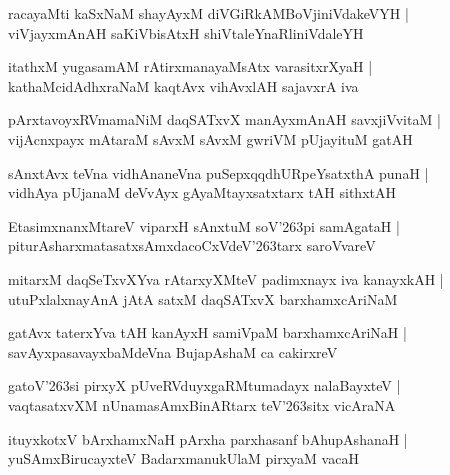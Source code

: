 \documentclass[twoside,12pt,openright]{book}
\def\S{\char'263}
\newcounter{shloka}[chapter]
\begin{document}
\begin{shloka}
racayaMti kaSxNaM shayAyxM diVGiRkAMBoVjiniVdakeVYH |\\
viVjayxmAnAH saKiVbisAtxH shiVtaleYnaRliniVdaleYH 
\end{shloka}

\begin{shloka}
itathxM yugasamAM rAtirxmanayaMsAtx varasitxrXyaH |\\
kathaMcidAdhxraNaM kaqtAvx vihAvxlAH sajavxrA iva 
\end{shloka}

\begin{shloka}
pArxtavoyxRVmamaNiM daqSATxvX manAyxmAnAH savxjiVvitaM |\\
vijAcnxpayx mAtaraM sAvxM  sAvxM gwriVM pUjayituM gatAH 
\end{shloka}

\begin{shloka}
sAnxtAvx teVna vidhAnaneVna puSepxqqdhURpeYsatxthA punaH |\\
vidhAya pUjanaM deVvAyx gAyaMtayxsatxtarx tAH sithxtAH 
\end{shloka}

\begin{shloka}
EtasimxnanxMtareV viparxH sAnxtuM soV\S pi samAgataH |\\
piturAsharxmatasatxsAmxdacoCxVdeV\S tarx saroVvareV 
\end{shloka}

\begin{shloka}
mitarxM daqSeTxvXYva rAtarxyXMteV padimxnayx iva kanayxkAH |\\
utuPxlalxnayAnA jAtA satxM daqSATxvX barxhamxcAriNaM 
\end{shloka}

\begin{shloka}
gatAvx taterxYva tAH kanAyxH samiVpaM  barxhamxcAriNaH |\\
savAyxpasavayxbaMdeVna BujapAshaM ca cakirxreV 
\end{shloka}

\begin{shloka}
gatoV\S si pirxyX pUveRVduyxgaRMtumadayx nalaBayxteV |\\
vaqtasatxvXM nUnamasAmxBinARtarx teV\S sitx vicAraNA 
\end{shloka}

\begin{shloka}
ituyxkotxV bArxhamxNaH pArxha parxhasanf bAhupAshanaH |\\
yuSAmxBirucayxteV BadarxmanukUlaM pirxyaM vacaH
\end{shloka}
\end{document}
